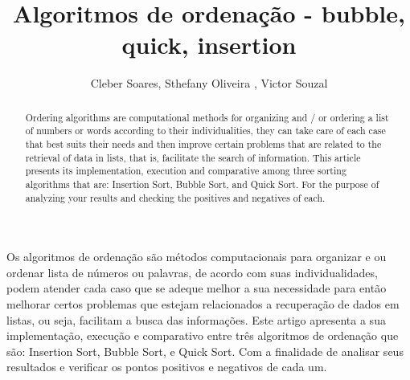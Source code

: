\documentclass[12pt]{article}
\title{Algoritmos de ordenação - bubble, quick, insertion}
\author{Cleber Soares\inst{1},  Sthefany Oliveira \inst{1}, Victor Souzal\inst{1} }
\begin{document}
 

\maketitle

\begin{abstract}
  Ordering algorithms are computational methods for organizing and / or ordering a list of numbers or words according to their individualities, they can take care of each case that best suits their needs and then improve certain problems that are related to the retrieval of data in lists, that is, facilitate the search of information. This article presents its implementation, execution and comparative among three sorting algorithms that are: Insertion Sort, Bubble Sort, and Quick Sort. For the purpose of analyzing your results and checking the positives and negatives of each.
\end{abstract}
     
\begin{resumo} 
  Os algoritmos de ordenação são métodos computacionais para organizar e ou ordenar lista de números ou palavras, de acordo com suas individualidades, podem atender cada caso que se adeque melhor a sua necessidade para então melhorar certos problemas que estejam relacionados a recuperação de dados em listas, ou seja, facilitam a busca das informações. Este artigo apresenta a sua implementação, execução e comparativo entre três algoritmos de ordenação que são: Insertion Sort, Bubble Sort, e Quick Sort. Com a finalidade de analisar seus resultados e verificar os pontos positivos e negativos de cada um.
\end{resumo}	


	
\end{document}
